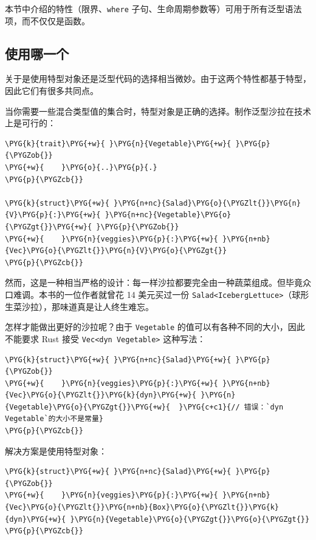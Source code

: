 本节中介绍的特性（限界、\texttt{where} 子句、生命周期参数等）可用于所有泛型语法项，而不仅仅是函数。

\subsection{使用哪一个}

关于是使用特型对象还是泛型代码的选择相当微妙。由于这两个特性都基于特型，因此它们有很多共同点。

当你需要一些混合类型值的集合时，特型对象是正确的选择。制作泛型沙拉在技术上是可行的：

\begin{Verbatim}[commandchars=\\\{\},breaklines=true,breakanywhere=true,fontsize=\codefont,xleftmargin=17bp]
\PYG{k}{trait}\PYG{+w}{ }\PYG{n}{Vegetable}\PYG{+w}{ }\PYG{p}{\PYGZob{}}
\PYG{+w}{    }\PYG{o}{..}\PYG{p}{.}
\PYG{p}{\PYGZcb{}}

\PYG{k}{struct}\PYG{+w}{ }\PYG{n+nc}{Salad}\PYG{o}{\PYGZlt{}}\PYG{n}{V}\PYG{p}{:}\PYG{+w}{ }\PYG{n+nc}{Vegetable}\PYG{o}{\PYGZgt{}}\PYG{+w}{ }\PYG{p}{\PYGZob{}}
\PYG{+w}{    }\PYG{n}{veggies}\PYG{p}{:}\PYG{+w}{ }\PYG{n+nb}{Vec}\PYG{o}{\PYGZlt{}}\PYG{n}{V}\PYG{o}{\PYGZgt{}}
\PYG{p}{\PYGZcb{}}
\end{Verbatim}

然而，这是一种相当严格的设计：每一样沙拉都要完全由一种蔬菜组成。但毕竟众口难调。本书的一位作者就曾花 14 美元买过一份 \texttt{Salad<IcebergLettuce>}（球形生菜沙拉），那味道真是让人终生难忘。

怎样才能做出更好的沙拉呢？由于 \texttt{Vegetable} 的值可以有各种不同的大小，因此不能要求 Rust 接受 \texttt{Vec<dyn Vegetable>} 这种写法：

\begin{Verbatim}[commandchars=\\\{\},breaklines=true,breakanywhere=true,fontsize=\codefont,xleftmargin=17bp]
\PYG{k}{struct}\PYG{+w}{ }\PYG{n+nc}{Salad}\PYG{+w}{ }\PYG{p}{\PYGZob{}}
\PYG{+w}{    }\PYG{n}{veggies}\PYG{p}{:}\PYG{+w}{ }\PYG{n+nb}{Vec}\PYG{o}{\PYGZlt{}}\PYG{k}{dyn}\PYG{+w}{ }\PYG{n}{Vegetable}\PYG{o}{\PYGZgt{}}\PYG{+w}{  }\PYG{c+c1}{// 错误：`dyn Vegetable`的大小不是常量}
\PYG{p}{\PYGZcb{}}
\end{Verbatim}

解决方案是使用特型对象：

\begin{Verbatim}[commandchars=\\\{\},breaklines=true,breakanywhere=true,fontsize=\codefont,xleftmargin=17bp]
\PYG{k}{struct}\PYG{+w}{ }\PYG{n+nc}{Salad}\PYG{+w}{ }\PYG{p}{\PYGZob{}}
\PYG{+w}{    }\PYG{n}{veggies}\PYG{p}{:}\PYG{+w}{ }\PYG{n+nb}{Vec}\PYG{o}{\PYGZlt{}}\PYG{n+nb}{Box}\PYG{o}{\PYGZlt{}}\PYG{k}{dyn}\PYG{+w}{ }\PYG{n}{Vegetable}\PYG{o}{\PYGZgt{}}\PYG{o}{\PYGZgt{}}
\PYG{p}{\PYGZcb{}}
\end{Verbatim}

